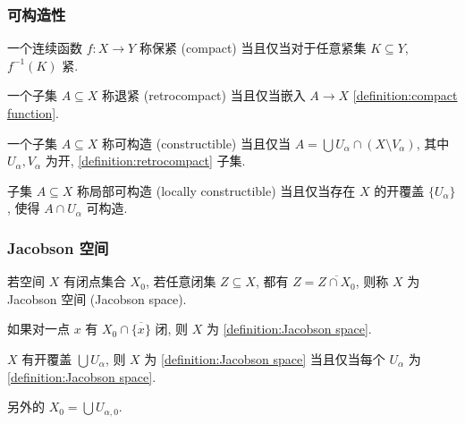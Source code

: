 \subsubsection{可构造性}

\begin{definition}[保紧]
    \label {definition:compact function}
    一个连续函数 \(f : X \to Y\) 称保紧 (compact) 当且仅当对于任意紧集 \(K \subseteq Y\), \(f^{-1} (K)\) 紧.
\end{definition}

\begin{definition}[退紧]
    \label {definition:retrocompact}
    一个子集 \(A \subseteq X\) 称退紧 (retrocompact) 当且仅当嵌入 \(A \to X\) \ref{definition:compact function}.
\end{definition}

\begin{definition}[可构造]
    \label {definition:constructible topology space}
    一个子集 \(A \subseteq X\) 称可构造 (constructible) 当且仅当 \(A = \bigcup U_\alpha \cap (X \setminus V_\alpha)\),
    其中 \(U_\alpha,V_\alpha\) 为开, \ref{definition:retrocompact} 子集.
\end{definition}

\begin{definition}[局部可构造]
    \label {definition:locally constructible}
    子集 \(A \subseteq X\) 称局部可构造 (locally constructible) 当且仅当存在 \(X\) 的开覆盖 \(\{U_\alpha\}\),
    使得 \(A \cap U_\alpha\) 可构造.
\end{definition}

\subsubsection{Jacobson 空间}

\begin{definition}[Jacobson 空间]
    \label {definition:Jacobson space}
    若空间 \(X\) 有闭点集合 \(X_0\), 若任意闭集 \(Z \subseteq X\), 都有 \(Z = \overline{Z \cap X_0}\), 则称 \(X\) 为 Jacobson 空间 (Jacobson space).
\end{definition}

\begin{lemma}
    如果对一点 \(x\) 有 \(X_0 \cap \overline{\{x\}}\) 闭, 则 \(X\) 为 \ref{definition:Jacobson space}.
\end{lemma}

\begin{lemma}
    \(X\) 有开覆盖 \(\bigcup U_\alpha\), 则 \(X\) 为 \ref{definition:Jacobson space} 当且仅当每个 \(U_\alpha\) 为 \ref{definition:Jacobson space}.

    另外的 \(X_0 = \bigcup U_{\alpha,0}\).
\end{lemma}

